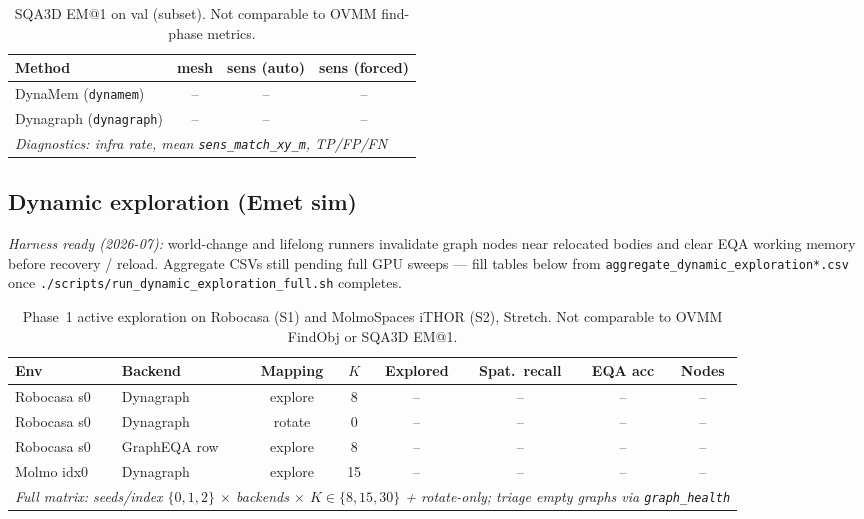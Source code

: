 \begin{table}[t]
  \centering
  \caption{SQA3D EM@1 on val (subset). Not comparable to OVMM find-phase metrics.}
  \label{tab:sqa3d_backend_replay}
  \small
  \begin{tabular}{@{}lccc@{}}
    \toprule
    Method & mesh & sens (auto) & sens (forced) \\
    \midrule
    DynaMem (\texttt{dynamem}) & -- & -- & -- \\
    Dynagraph (\texttt{dynagraph}) & -- & -- & -- \\
    \midrule
    \multicolumn{4}{l}{\textit{Diagnostics: infra rate, mean \texttt{sens\_match\_xy\_m}, TP/FP/FN}} \\
    \bottomrule
  \end{tabular}
\end{table}

\subsection{Dynamic exploration (Emet sim)}
\label{sec:dynamic_explore_results}

\textit{Harness ready (2026-07):} world-change and lifelong runners invalidate graph nodes near relocated bodies and clear EQA working memory before recovery / reload. Aggregate CSVs still pending full GPU sweeps --- fill tables below from \texttt{aggregate\_dynamic\_exploration*.csv} once \texttt{./scripts/run\_dynamic\_exploration\_full.sh} completes.

\begin{table}[t]
  \centering
  \caption{Phase~1 active exploration on Robocasa (S1) and MolmoSpaces iTHOR (S2), Stretch. Not comparable to OVMM FindObj or SQA3D EM@1.}
  \label{tab:dynamic_explore_phase1}
  \small
  \begin{tabular}{@{}llcccccc@{}}
    \toprule
    Env & Backend & Mapping & $K$ & Explored & Spat.\ recall & EQA acc & Nodes \\
    \midrule
    Robocasa s0 & Dynagraph & explore & 8 & -- & -- & -- & -- \\
    Robocasa s0 & Dynagraph & rotate & 0 & -- & -- & -- & -- \\
    Robocasa s0 & GraphEQA row & explore & 8 & -- & -- & -- & -- \\
    Molmo idx0 & Dynagraph & explore & 15 & -- & -- & -- & -- \\
    \midrule
    \multicolumn{8}{l}{\textit{Full matrix: seeds/index $\{0,1,2\}$ $\times$ backends $\times$ $K \in \{8,15,30\}$ + rotate-only; triage empty graphs via \texttt{graph\_health}}} \\
    \bottomrule
  \end{tabular}
\end{table}

